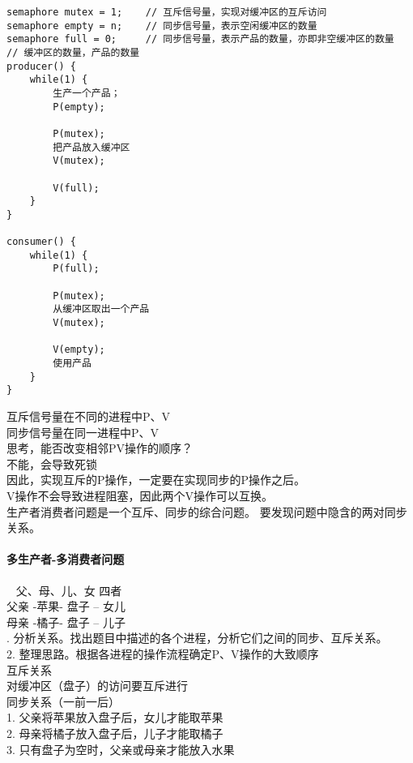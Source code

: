 \begin{lstlisting}
semaphore mutex = 1;	// 互斥信号量，实现对缓冲区的互斥访问
semaphore empty = n;	// 同步信号量，表示空闲缓冲区的数量
semaphore full = 0;		// 同步信号量，表示产品的数量，亦即非空缓冲区的数量
// 缓冲区的数量，产品的数量
producer() {
	while(1) {
		生产一个产品；
		P(empty);
		
		P(mutex);
		把产品放入缓冲区
		V(mutex);
		
		V(full);
	}
}

consumer() {
	while(1) {
		P(full);
		
		P(mutex);
		从缓冲区取出一个产品
		V(mutex);
		
		V(empty);
		使用产品
	}
}
\end{lstlisting}
\noindent
互斥信号量在不同的进程中P、V \\
同步信号量在同一进程中P、V \\
\noindent
思考，能否改变相邻PV操作的顺序？ \\
不能，会导致死锁 \\
因此，实现互斥的P操作，一定要在实现同步的P操作之后。 \\
V操作不会导致进程阻塞，因此两个V操作可以互换。 \\
\noindent
生产者消费者问题是一个互斥、同步的综合问题。
要发现问题中隐含的两对同步关系。 \\ 

\paragraph{多生产者-多消费者问题}~{}
\newline
父、母、儿、女 四者 \\
父亲 -苹果- 盘子 -- 女儿 \\
母亲 -橘子- 盘子 -- 儿子 \\
. 分析关系。找出题目中描述的各个进程，分析它们之间的同步、互斥关系。 \\
2. 整理思路。根据各进程的操作流程确定P、V操作的大致顺序 \\
\noindent
互斥关系 \\ \noindent
对缓冲区（盘子）的访问要互斥进行 \\ \noindent
同步关系（一前一后） \\
1. 父亲将苹果放入盘子后，女儿才能取苹果 \\
2. 母亲将橘子放入盘子后，儿子才能取橘子 \\
3. 只有盘子为空时，父亲或母亲才能放入水果 \\

